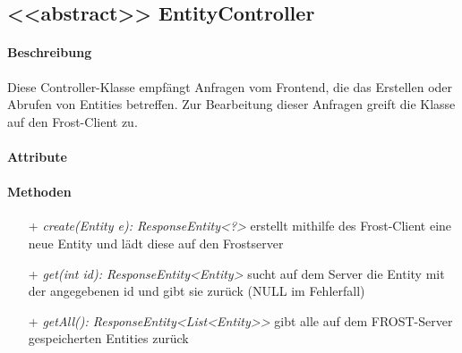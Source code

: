 \subsection{<{<{abstract}>}> EntityController}

\paragraph{Beschreibung}
Diese Controller-Klasse empfängt Anfragen vom Frontend, die das Erstellen oder Abrufen von Entities betreffen. Zur Bearbeitung dieser Anfragen greift die Klasse auf den Frost-Client zu.


\paragraph{Attribute}

\paragraph{Methoden}
\begin{itemize}
\item[+] \textit{ create(Entity e): ResponseEntity<?> }
erstellt mithilfe des Frost-Client eine neue Entity und lädt diese auf den Frostserver
\item[+] \textit{get(int id): ResponseEntity<Entity>}
sucht auf dem Server die Entity mit der angegebenen id und gibt sie zurück (NULL im Fehlerfall)
\item[+] \textit{getAll(): ResponseEntity<List<Entity>>}
gibt alle auf dem FROST-Server gespeicherten Entities zurück
\end{itemize}